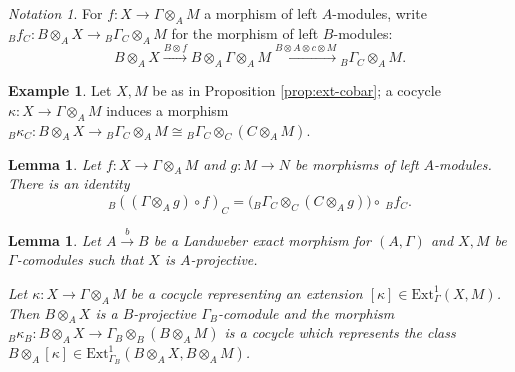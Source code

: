 \documentclass[10pt,a4paper]{amsart}
\newtheorem{lem}[thm]{Lemma}
\theoremstyle{definition}
\newtheorem{exam}[thm]{Example}
\theoremstyle{remark}
\newtheorem{nota}[thm]{Notation}
\newcommand{\BGammaC}{{_B\Gamma_C}}
\newcommand{\ext}{\mathrm{Ext}}
\begin{document}
\begin{nota}
	For $f: X \rightarrow \Gamma \otimes_A M $ a morphism of left
$A$-modules, write $_Bf_C : B \otimes _A X \rightarrow \BGammaC \otimes _A M$ for the morphism of left $B$-modules:
\[
	B \otimes _A X
\stackrel{B \otimes f } {\rightarrow}
B \otimes _A \Gamma \otimes _A M
\stackrel{B \otimes A \otimes c \otimes M}{\rightarrow}
\BGammaC \otimes _A M.
\]
\end{nota}

\begin{exam}
 Let $X, M$ be as in Proposition \ref{prop:ext-cobar};	a cocycle $\kappa : X \rightarrow \Gamma \otimes_A M$  induces a
morphism $_B \kappa _C : B\otimes_A X \rightarrow \BGammaC \otimes _A M \cong \BGammaC \otimes_C (C \otimes_A M)$.
\end{exam}


\begin{lem}
\label{lem:cocycle_base_change}
Let $f : X \rightarrow \Gamma \otimes_A M $  and $g: M \rightarrow N$ be morphisms of left $A$-modules.
There is an identity
\[
	_B ((\Gamma \otimes_A g) \circ f ) _C = \Big( \BGammaC \otimes_C (C \otimes_A g) \Big) \circ \
_Bf_C.
\]
\end{lem}

\begin{lem}
	\label{lem:cocycle-base-change}
Let  $A\stackrel{b}{\rightarrow} B$ be
a Landweber exact morphism for $(A,\Gamma)$ and  $X,M$ be
$\Gamma$-comodules such that $X$ is  $A$-projective.

Let $\kappa : X \rightarrow \Gamma \otimes _A M$ be a cocycle representing an
extension $[\kappa] \in \ext^1_\Gamma (X, M)$. Then $B  \otimes_A X$ is a $B$-projective $\Gamma_B$-comodule and the morphism
$_B\kappa_B : B \otimes _A X \rightarrow \Gamma _B \otimes _B (B \otimes _A M)
$ is a cocycle which represents the class $B \otimes _A [\kappa ]   \in
\ext^1_{\Gamma_B} (B \otimes_A X , B \otimes_A M)$.
\end{lem}
\end{document}
